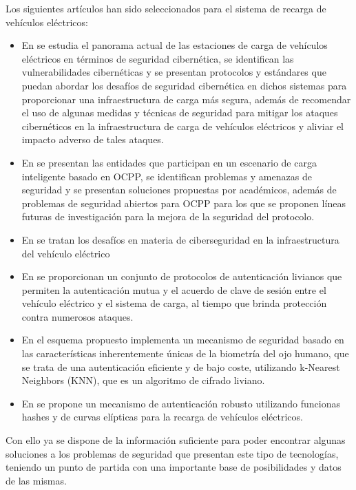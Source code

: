 \documentclass[12pt,a4paper,onecolumn,oneside]{report}
\begin{document}
Los siguientes artículos han sido seleccionados para el sistema de recarga de vehículos eléctricos:
\begin{itemize}
\item En \cite{eanueve} se estudia el panorama actual de las estaciones de carga de vehículos eléctricos en términos de seguridad cibernética, se identifican las vulnerabilidades cibernéticas y se presentan protocolos y estándares que puedan abordar los desafíos de seguridad cibernética en dichos sistemas para proporcionar una infraestructura de carga más segura, además de recomendar el uso de algunas medidas y técnicas de seguridad para mitigar los ataques cibernéticos en la infraestructura de carga de vehículos eléctricos y aliviar el impacto adverso de tales ataques.
\item En \cite{eadiez} se presentan las entidades que participan en un escenario de carga inteligente basado en OCPP, se identifican problemas y amenazas de seguridad y se presentan soluciones propuestas por académicos, además de problemas de seguridad abiertos para OCPP para los que se proponen líneas futuras de investigación para la mejora de la seguridad del protocolo.
\item En \cite{eaonce} se tratan los desafíos en materia de ciberseguridad en la infraestructura del vehículo eléctrico
\item En \cite{eadoce} se proporcionan un conjunto de protocolos de autenticación livianos que permiten la autenticación mutua y el acuerdo de clave de sesión entre el vehículo eléctrico y el sistema de carga, al tiempo que brinda protección contra numerosos ataques.
\item En \cite{eatrece} el esquema propuesto implementa un mecanismo de seguridad basado en las características inherentemente únicas de la biometría del ojo humano, que se trata de una autenticación eficiente y de bajo coste, utilizando k-Nearest Neighbors (KNN), que es un algoritmo de cifrado liviano.
\item En \cite{eacatorce} se propone un mecanismo de autenticación robusto utilizando funcionas hashes y de curvas elípticas para la recarga de vehículos eléctricos.

\end{itemize}

Con ello ya se dispone de la información suficiente para poder encontrar algunas soluciones a los problemas de seguridad que presentan este tipo de tecnologías, teniendo un punto de partida con una importante base de posibilidades y datos de las mismas.
\end{document}
